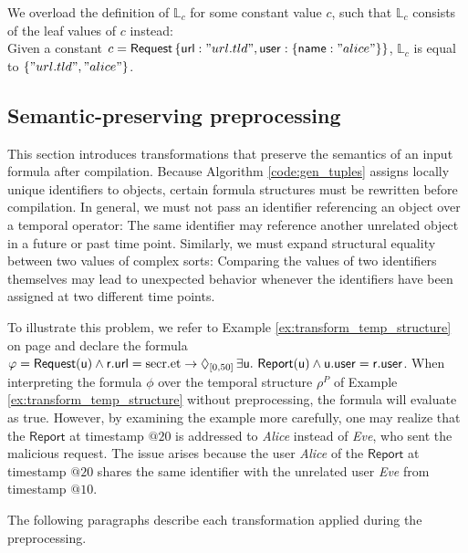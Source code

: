 We overload the definition of $\mathds{L}_c$ for some constant value $c$, such that $\mathds{L}_c$ consists of the leaf values of $c$ instead:\\
Given a constant $c = \mathsf{Request} \left\{ \mathsf{url}: "url.tld", \mathsf{user}: \{ \mathsf{name}: "alice" \} \right\}$, $\mathds{L}_c$ is equal to $\left\{ "url.tld", "alice" \right\}$.

\subsection{Semantic-preserving preprocessing}
\label{sec:preprocessing}
This section introduces transformations that preserve the semantics of an input formula after compilation. Because Algorithm \ref{code:gen_tuples} assigns locally unique identifiers to objects, certain formula structures must be rewritten before compilation. In general, we must not pass an identifier referencing an object over a temporal operator: The same identifier may reference another unrelated object in a future or past time point. Similarly, we must expand structural equality between two values of complex sorts: Comparing the values of two identifiers themselves may lead to unexpected behavior whenever the identifiers have been assigned at two different time points.

To illustrate this problem, we refer to Example \ref{ex:transform_temp_structure} on page \pageref{ex:transform_temp_structure} and declare the formula $\varphi = \mathsf{Request(u) \land \mathsf{r.url} = \text{secr.et}} \rightarrow \operatorname{\lozenge}_{[0, 50]} \exists \mathsf{u}.\ \mathsf{Report(u)} \land \mathsf{u.user} = \mathsf{r.user}$. When interpreting the formula $\phi$ over the temporal structure $\rho^P$ of Example \ref{ex:transform_temp_structure} without preprocessing, the formula will evaluate as true. However, by examining the example more carefully, one may realize that the $\mathsf{Report}$ at timestamp $@20$ is addressed to \textit{Alice} instead of \textit{Eve}, who sent the malicious request. The issue arises because the user \textit{Alice} of the $\mathsf{Report}$ at timestamp $@20$ shares the same identifier with the unrelated user \textit{Eve} from timestamp $@10$.

The following paragraphs describe each transformation applied during the preprocessing.

